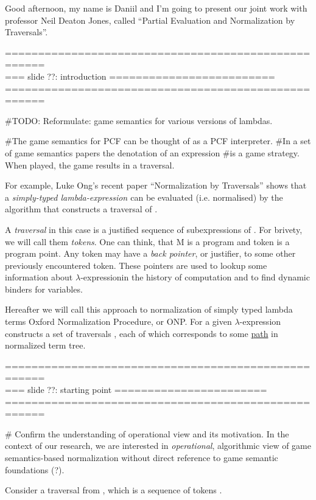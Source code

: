 \documentclass[a4paper, 10pt]{article} %
\newcommand{\red}[1]{{\color{red}#1}}
\newcommand{\green}[1]{{\color{blue!20!black!30!green}#1}}
\newcommand{\blue}[1]{{\color{blue}#1}}
\newcommand{\lam}[1]{{\color{brown}\emph{\boldmath{#1}}}}
\newcommand{\lexp}{$\lambda$-expression}
\begin{document}
Good afternoon, my name is Daniil and I'm going to present our joint work with 
professor Neil Deaton Jones, called ``Partial Evaluation and Normalization by 
Traversals''. 


====================================================\\
=== slide ??: introduction =========================\\
====================================================


\#TODO:
Reformulate: game semantics for various versions of lambdas.

\#The game semantics for PCF can be thought of as a PCF interpreter.
\#In a set of game semantics papers the denotation of an expression
\#is a game strategy. When played, the game results in a traversal.

For example, Luke Ong’s recent paper ``Normalization by Traversals''
shows that a \blue{\emph{simply-typed lambda-expression \lam{M}}}
can be \red{evaluated} (i.e. normalised) by the algorithm that
constructs a \green{traversal} of \lam{M}.

A \green{\emph{traversal}} in this case is a justified sequence
of subexpressions of \lam{M}. For brivety, we will call them
\green{\emph{tokens}}.  One can think, that M is 
a \blue{program} and token is a \blue{program point}. Any token
may have a \green{\emph{back pointer}}, or justifier, to some other 
previously encountered token. These pointers are used to lookup some 
information about \lexp in the history of computation and to find
dynamic binders for variables.

Hereafter we will call this approach to normalization of simply typed
lambda terms Oxford Normalization Procedure, or ONP. For a given \lexp
\lam{$M$} \lam{ONP} constructs a set of traversals
\lam{$\mathfrak{Trav}(M)$}, each of which corresponds to some
\underline{path} in normalized term tree.


====================================================\\
=== slide ??: starting point =======================\\
====================================================

\# Confirm the understanding of operational view and its motivation.
In the context of our research, we are interested in \emph{operational}, 
algorithmic view of game semantics-based normalization without direct
reference to game semantic foundations (?).

Consider a traversal \lam{$tr$} from \lam{$\mathfrak{Trav}(M)$}, which is
a sequence of tokens \lam{$t_0$} \lam{$t_n$}.
\end{document}
